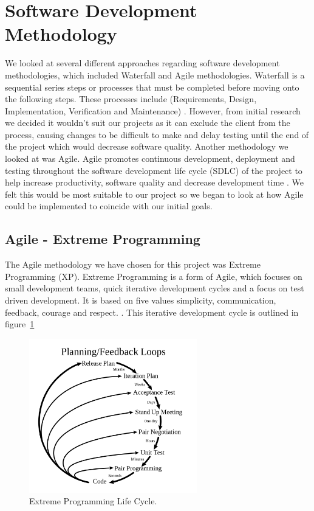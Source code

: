 \section{Software Development Methodology}
We looked at several different approaches regarding software development methodologies, which included Waterfall and Agile methodologies. Waterfall is a sequential series steps or processes that must be completed before moving onto the following steps. These processes include (Requirements, Design, Implementation, Verification and Maintenance) \cite{cheatham1991object}. However, from initial research we decided it wouldn't suit our projects as it can exclude the client from the process, causing changes to be difficult to make and delay testing until the end of the project which would decrease software quality. Another methodology we looked at was Agile. Agile promotes continuous development, deployment and testing throughout the software development life cycle (SDLC) of the project to help increase productivity, software quality and decrease development time \cite{Cohen2003AgileSD}. We felt this would be most suitable to our project so we began to look at how Agile could be implemented to coincide with our initial goals.

\subsection{Agile - Extreme Programming}
The Agile methodology we have chosen for this project was Extreme Programming (XP). Extreme Programming is a form of Agile, which focuses on small development teams, quick iterative development cycles and a focus on test driven development. It is based on five values simplicity, communication, feedback, courage and respect. \cite[p.~4]{1335275620040101}. This iterative development cycle is outlined in figure~\ref{image:XP}

\begin{figure}[h!]
	\caption{Extreme Programming Life Cycle.}
	\label{image:XP}
	\centering
	\includegraphics[width=0.65\textwidth]{Images/Extreme_Programming.png}
\end{figure}	

